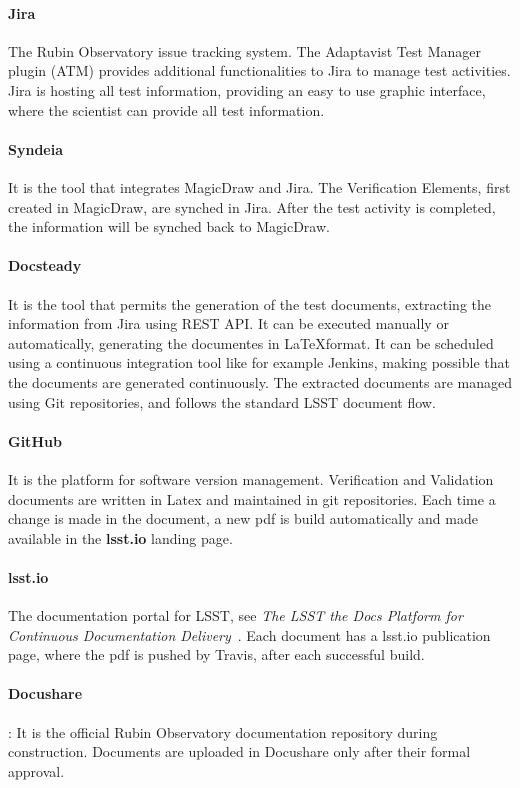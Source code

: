 \paragraph{Jira}
The Rubin Observatory issue tracking system.
The Adaptavist Test Manager plugin (ATM) provides additional functionalities to Jira to manage test activities.
Jira is hosting all test information, providing an easy to use graphic interface, where the scientist can provide all test information.

\paragraph{Syndeia}
It is the tool that integrates MagicDraw and Jira. The Verification Elements, first created in MagicDraw,
are synched in Jira. After the test activity is completed, the information will be synched back to MagicDraw.

\paragraph{Docsteady}
It is the tool that permits the generation of the test documents, extracting the information from Jira using REST API.
It can be executed manually or automatically, generating the documentes in \LaTeX format.
It can be scheduled using a continuous integration tool like for example Jenkins, making possible that 
the documents are generated continuously.
The extracted documents are managed using Git repositories, and follows the  standard LSST document flow.

\paragraph{GitHub}
It is the platform for software version management.
Verification and Validation documents are written in Latex and maintained in git repositories.
Each time a change is made in the document, a new pdf is build automatically and made available in the \textbf{lsst.io} landing page.

\paragraph{lsst.io}
    The documentation portal for LSST, see \textit{The LSST the Docs Platform for Continuous Documentation Delivery}\cite{SQR-006}~.
Each document has a lsst.io publication page, where the pdf is pushed by Travis, after each successful build.

\paragraph{Docushare}:
It is the official Rubin Observatory documentation repository during construction.
Documents are uploaded in Docushare only after their formal approval.


